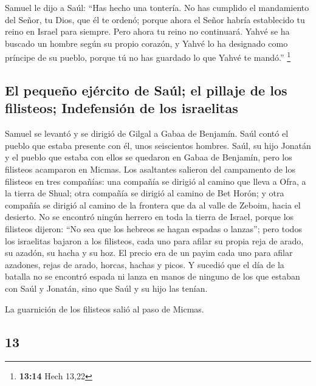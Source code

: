 \begin{paracol}{2}
 Samuel le dijo a Saúl: ``Has hecho una tontería. No has
cumplido el mandamiento del Señor, tu Dios, que él te ordenó; porque
ahora el Señor habría establecido tu reino en Israel para siempre.
 Pero ahora tu reino no continuará. Yahvé se ha buscado
un hombre según su propio corazón, y Yahvé lo ha designado como príncipe
de su pueblo, porque tú no has guardado lo que Yahvé te mandó.''
\footnote{\textbf{13:14} Hech 13,22}

\hypertarget{el-pequeuxf1o-ejuxe9rcito-de-sauxfal-el-pillaje-de-los-filisteos-indefensiuxf3n-de-los-israelitas}{%
\subsection{El pequeño ejército de Saúl; el pillaje de los filisteos;
Indefensión de los
israelitas}\label{el-pequeuxf1o-ejuxe9rcito-de-sauxfal-el-pillaje-de-los-filisteos-indefensiuxf3n-de-los-israelitas}}

 Samuel se levantó y se dirigió de Gilgal a Gabaa de
Benjamín. Saúl contó el pueblo que estaba presente con él, unos
seiscientos hombres.  Saúl, su hijo Jonatán y el pueblo
que estaba con ellos se quedaron en Gabaa de Benjamín, pero los
filisteos acamparon en Micmas.  Los asaltantes salieron
del campamento de los filisteos en tres compañías: una compañía se
dirigió al camino que lleva a Ofra, a la tierra de Shual;
 otra compañía se dirigió al camino de Bet Horón; y otra
compañía se dirigió al camino de la frontera que da al valle de Zeboim,
hacia el desierto.  No se encontró ningún herrero en toda
la tierra de Israel, porque los filisteos dijeron: ``No sea que los
hebreos se hagan espadas o lanzas'';  pero todos los
israelitas bajaron a los filisteos, cada uno para afilar su propia reja
de arado, su azadón, su hacha y su hoz.  El precio era de
un payim cada uno para afilar azadones, rejas de arado, horcas, hachas y
picos.  Y sucedió que el día de la batalla no se encontró
espada ni lanza en manos de ninguno de los que estaban con Saúl y
Jonatán, sino que Saúl y su hijo las tenían.

 La guarnición de los filisteos salió al paso de Micmas.

\switchcolumn
\begin{otherlanguage}{english}

\hypertarget{section-25}{%
\section{13}\label{section-25}}


\end{otherlanguage}
\end{paracol}
